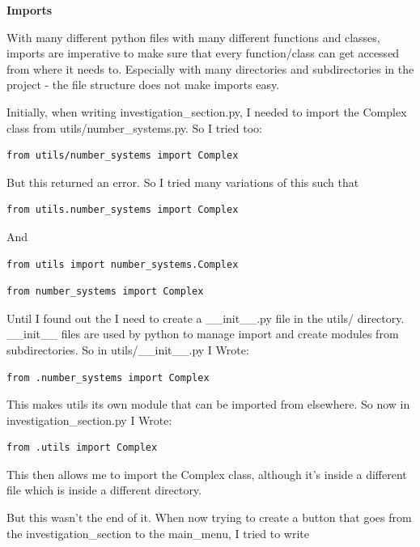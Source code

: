 \documentclass[12pt]{article}
\begin{document}
\textbf{Imports}

With many different python files with many different functions and classes, imports are imperative to make sure that  every function/class can get accessed from where it needs to. Especially with many directories and subdirectories in the project - the file structure does not make imports easy.

Initially, when writing investigation\_section.py, I needed to import the Complex class from utils/number\_systems.py. So I tried too:

\begin{lstlisting}
from utils/number_systems import Complex
\end{lstlisting}

But this returned an error. So I tried many variations of this such that

\begin{lstlisting}
from utils.number_systems import Complex
\end{lstlisting}

And

\begin{lstlisting}
from utils import number_systems.Complex
\end{lstlisting}

\begin{lstlisting}
from number_systems import Complex
\end{lstlisting}

Until I found out the I need to create a \_\_init\_\_.py file in the utils/ directory. \_\_init\_\_ files are used by python to manage import and create modules from subdirectories.
So in utils/\_\_init\_\_.py I Wrote:

\begin{lstlisting}
from .number_systems import Complex
\end{lstlisting}

This makes utils its own module that can be imported from elsewhere. So now in investigation\_section.py I Wrote:

\begin{lstlisting}
from .utils import Complex
\end{lstlisting}

This then allows me to import the Complex class, although it's inside a different file which is inside a different directory.

But this wasn't the end of it. When now trying to create a button that goes from the investigation\_section to the main\_menu, I tried to write
\end{document}
